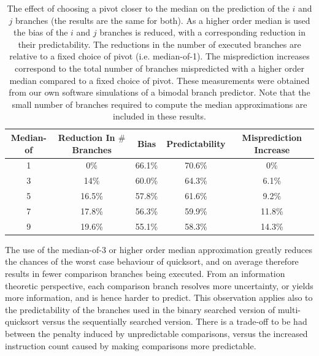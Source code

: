 \documentclass[acmtocl]{acmtrans2m}
\begin{document}
\begin{table}
\begin{tabular}{|c|c|c|c|c|}
\hline
Median-of & Reduction In $\#$Branches & Bias    & Predictability & Misprediction Increase \\
\hline                                                                                   
1         & 0\%                       & 66.1\%  & 70.6\%         & 0\%                    \\
\hline
3         & 14\%                      & 60.0\%  & 64.3\%         & 6.1\%                  \\
\hline
5         & 16.5\%                    & 57.8\%  & 61.6\%         & 9.2\%                  \\                     
\hline
7         & 17.8\%                    & 56.3\%  & 59.9\%         & 11.8\%                 \\
\hline
9         & 19.6\%                    & 55.1\% & 58.3\%          & 14.3\%                 \\
\hline
\end{tabular}
\caption{The effect of choosing a pivot closer to the median on the prediction
of the $i$ and $j$ branches (the results are the same for both). As a higher order median is used the bias of the $i$ and $j$
branches is reduced, with a corresponding reduction in their predictability.
The reductions in the number of executed branches are relative to a fixed choice of pivot (i.e. median-of-1). 
The misprediction increases correspond to the total number
of branches mispredicted with a higher order median compared to a fixed choice of pivot.
These measurements were obtained 
from our own software simulations of a bimodal branch predictor. Note that the small number of branches
required to compute the median approximations are included in these results.}
\label{median_table} 
\end{table}

The use of the median-of-3 or higher order median approximation greatly reduces the
chances of the worst case behaviour of quicksort, and on average therefore results
in fewer comparison branches being executed. From an information theoretic
perspective, each comparison branch resolves more uncertainty, or yields
more information, and is hence harder to predict. This observation applies also
to the predictability of the branches used in the binary searched version of 
multi-quicksort versus the sequentially searched version. There is a trade-off
to be had between the penalty induced by unpredictable comparisons, versus the 
increased instruction count caused by making comparisons more predictable.
\end{document}
